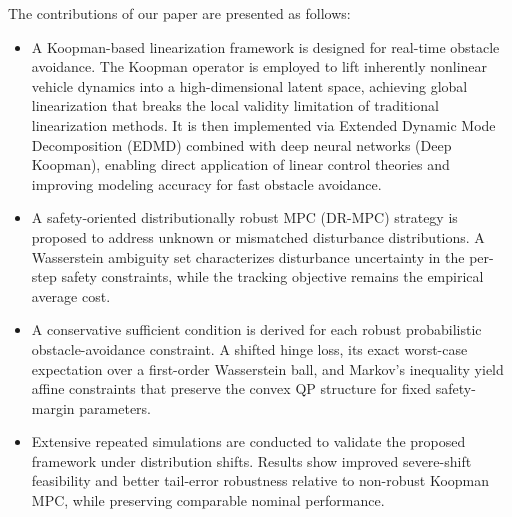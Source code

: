 \documentclass[pdflatex,sn-mathphys,Numbered]{sn-jnl}
\numberwithin{equation}{section}
\begin{document}
	The contributions of our paper are presented as follows:
	\begin{itemize}
		\item[i)] A Koopman-based linearization framework is designed for real-time obstacle avoidance. The Koopman operator is employed to lift inherently nonlinear vehicle dynamics into a high-dimensional latent space, achieving global linearization that breaks the local validity limitation of traditional linearization methods. It  is then implemented via Extended Dynamic Mode Decomposition (EDMD) combined with deep neural networks (Deep Koopman), enabling direct application of linear control theories and improving modeling accuracy for fast obstacle avoidance.
		\item[ii)] A safety-oriented distributionally robust MPC (DR-MPC) strategy is proposed to address unknown or mismatched disturbance distributions. A Wasserstein ambiguity set characterizes disturbance uncertainty in the per-step safety constraints, while the tracking objective remains the empirical average cost.
		\item[iii)] A conservative sufficient condition is derived for each robust probabilistic obstacle-avoidance constraint. A shifted hinge loss, its exact worst-case expectation over a first-order Wasserstein ball, and Markov's inequality yield affine constraints that preserve the convex QP structure for fixed safety-margin parameters.
		\item[iv)] Extensive repeated simulations are conducted to validate the proposed framework under distribution shifts. Results show improved severe-shift feasibility and better tail-error robustness relative to non-robust Koopman MPC, while preserving comparable nominal performance.
	\end{itemize}
	
	
\end{document}
